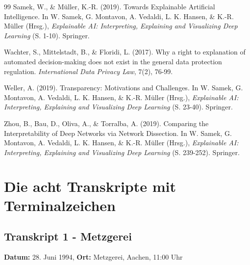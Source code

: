 \documentclass[
  12pt,
  a4paper,
  oneside,
  titlepage
]{article}
\begin{document}
\begin{thebibliography}{99}
Samek, W., \& Müller, K.-R. (2019). Towards Explainable Artificial Intelligence. 
In W. Samek, G. Montavon, A. Vedaldi, L. K. Hansen, \& K.-R. Müller (Hrsg.), 
\textit{Explainable AI: Interpreting, Explaining and Visualizing Deep Learning} 
(S. 1-10). Springer.

Wachter, S., Mittelstadt, B., \& Floridi, L. (2017). Why a right to explanation 
of automated decision-making does not exist in the general data protection 
regulation. \textit{International Data Privacy Law}, 7(2), 76-99.

Weller, A. (2019). Transparency: Motivations and Challenges. In W. Samek, 
G. Montavon, A. Vedaldi, L. K. Hansen, \& K.-R. Müller (Hrsg.), 
\textit{Explainable AI: Interpreting, Explaining and Visualizing Deep Learning} 
(S. 23-40). Springer.

Zhou, B., Bau, D., Oliva, A., \& Torralba, A. (2019). Comparing the Interpretability 
of Deep Networks via Network Dissection. In W. Samek, G. Montavon, A. Vedaldi, 
L. K. Hansen, \& K.-R. Müller (Hrsg.), \textit{Explainable AI: Interpreting, 
Explaining and Visualizing Deep Learning} (S. 239-252). Springer.

\end{thebibliography}

\newpage
\appendix
\section{Die acht Transkripte mit Terminalzeichen}

\subsection{Transkript 1 - Metzgerei}
\textbf{Datum:} 28. Juni 1994, \textbf{Ort:} Metzgerei, Aachen, 11:00 Uhr
\end{document}
